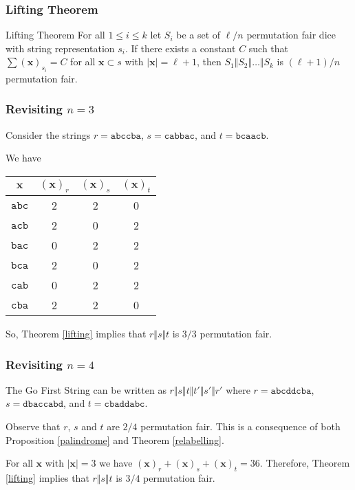 \documentclass[aspectratio=169]{beamer}
\begin{document}
\begin{frame}[triangle=siiblue]
\frametitle{Lifting Theorem}
\begin{siitheorem}[label=lifting]{Lifting Theorem}{}
For all $1 \leq i \leq k$ let $S_i$ be a set of $\ell/n$ permutation fair dice with string representation $s_i$. If there exists a constant $C$ such that $\sum (\mathbf{x})_{s_i} = C$ for all $\mathbf{x} \subset s$ with $|\mathbf{x}| = \ell+1$, then $S_1 \Vert S_2 \Vert \ldots \Vert S_k$ is $(\ell+1)/n$ permutation fair.
\end{siitheorem}

\end{frame}
\begin{frame}[triangle=siiblue]
\frametitle{Revisiting $n=3$}
Consider the strings $r = \texttt{abccba}$, $s = \texttt{cabbac}$, and $t = \texttt{bcaacb}$.

\vfill

We have
{
\footnotesize
\begin{table}
\begin{tabular}{c ccc} \toprule
$\mathbf{x}$ & $(\mathbf{x})_r$ & $(\mathbf{x})_s$ & $(\mathbf{x})_t$ \\ \midrule
$\texttt{abc}$ & 2 & 2 & 0 \\
$\texttt{acb}$ & 2 & 0 & 2 \\
$\texttt{bac}$ & 0 & 2 & 2 \\
$\texttt{bca}$ & 2 & 0 & 2 \\
$\texttt{cab}$ & 0 & 2 & 2 \\
$\texttt{cba}$ &  2 & 2 & 0 \\ \bottomrule
\end{tabular}
\end{table}
}
\vfill

So, Theorem \ref{lifting} implies that $r \Vert s \Vert t$ is $3/3$ permutation fair. 
\end{frame}

\begin{frame}[triangle=siiblue]
\frametitle{Revisiting $n=4$}
The Go First String can be written as $r \Vert s \Vert t \Vert t' \Vert s' \Vert r'$ where $r = \texttt{abcddcba}$,  $s = \texttt{dbaccabd}$, and  $t = \texttt{cbaddabc}$.

\vfill

Observe that $r$,  $s$ and $t$ are $2/4$ permutation fair. This is a consequence of both Proposition \ref{palindrome} and Theorem \ref{relabelling}.

\vfill

For all $\mathbf{x}$ with $|\mathbf{x}| = 3$ we have $(\mathbf{x})_r + (\mathbf{x})_s + (\mathbf{x})_t = 36$. Therefore, Theorem \ref{lifting} implies that $r \Vert s \Vert t$ is $3/4$ permutation fair.
\end{frame}
\end{document}
